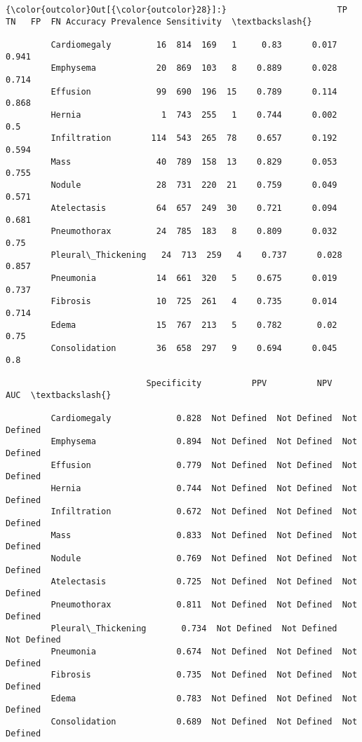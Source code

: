 \documentclass[11pt]{article}
\begin{document}
\begin{Verbatim}[commandchars=\\\{\}]
{\color{outcolor}Out[{\color{outcolor}28}]:}                      TP   TN   FP  FN Accuracy Prevalence Sensitivity  \textbackslash{}
                                                                                 
         Cardiomegaly         16  814  169   1     0.83      0.017       0.941   
         Emphysema            20  869  103   8    0.889      0.028       0.714   
         Effusion             99  690  196  15    0.789      0.114       0.868   
         Hernia                1  743  255   1    0.744      0.002         0.5   
         Infiltration        114  543  265  78    0.657      0.192       0.594   
         Mass                 40  789  158  13    0.829      0.053       0.755   
         Nodule               28  731  220  21    0.759      0.049       0.571   
         Atelectasis          64  657  249  30    0.721      0.094       0.681   
         Pneumothorax         24  785  183   8    0.809      0.032        0.75   
         Pleural\_Thickening   24  713  259   4    0.737      0.028       0.857   
         Pneumonia            14  661  320   5    0.675      0.019       0.737   
         Fibrosis             10  725  261   4    0.735      0.014       0.714   
         Edema                15  767  213   5    0.782       0.02        0.75   
         Consolidation        36  658  297   9    0.694      0.045         0.8   
         
                            Specificity          PPV          NPV          AUC  \textbackslash{}
                                                                                 
         Cardiomegaly             0.828  Not Defined  Not Defined  Not Defined   
         Emphysema                0.894  Not Defined  Not Defined  Not Defined   
         Effusion                 0.779  Not Defined  Not Defined  Not Defined   
         Hernia                   0.744  Not Defined  Not Defined  Not Defined   
         Infiltration             0.672  Not Defined  Not Defined  Not Defined   
         Mass                     0.833  Not Defined  Not Defined  Not Defined   
         Nodule                   0.769  Not Defined  Not Defined  Not Defined   
         Atelectasis              0.725  Not Defined  Not Defined  Not Defined   
         Pneumothorax             0.811  Not Defined  Not Defined  Not Defined   
         Pleural\_Thickening       0.734  Not Defined  Not Defined  Not Defined   
         Pneumonia                0.674  Not Defined  Not Defined  Not Defined   
         Fibrosis                 0.735  Not Defined  Not Defined  Not Defined   
         Edema                    0.783  Not Defined  Not Defined  Not Defined   
         Consolidation            0.689  Not Defined  Not Defined  Not Defined   
         

\end{Verbatim}
\end{document}
